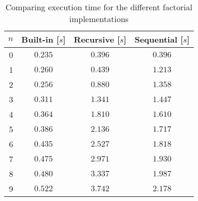\begin{table}[htp]
	\begin{center}
	\caption{Comparing execution time for
the different factorial implementations}
	\label{tab:facT}
		\begin{tabular}{rccc}
		\toprule
			{$n$} & {Built-in [$s$]} & {Recursive [$s$]} & {Sequential [$s$]}\\
			\midrule
			{0} & $0.235$ & $0.396$ & $0.396$\\
			{1} & $0.260$ & $0.439$ & $1.213$\\
			{2} & $0.256$ & $0.880$ & $1.358$\\
			{3} & $0.311$ & $1.341$ & $1.447$\\
			{4} & $0.364$ & $1.810$ & $1.610$\\
			{5} & $0.386$ & $2.136$ & $1.717$\\
			{6} & $0.435$ & $2.527$ & $1.818$\\
			{7} & $0.475$ & $2.971$ & $1.930$\\
			{8} & $0.480$ & $3.337$ & $1.987$\\
			{9} & $0.522$ & $3.742$ & $2.178$\\
		\bottomrule
		\end{tabular}
	\end{center}
\end{table}